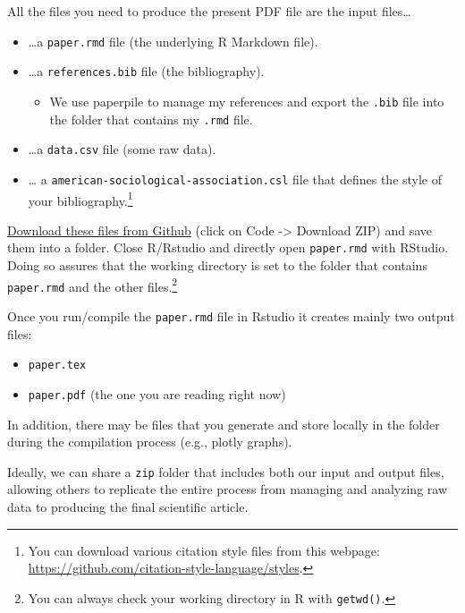 \documentclass[
  12pt,
]{article}
\providecommand{\tightlist}{%
  \setlength{\itemsep}{0pt}\setlength{\parskip}{0pt}}
\begin{document}
All the files you need to produce the present PDF file are the input files\ldots{}

\begin{itemize}
\tightlist
\item
  \ldots a \texttt{paper.rmd} file (the underlying R Markdown file).
\item
  \ldots a \texttt{references.bib} file (the bibliography).

  \begin{itemize}
  \tightlist
  \item
    We use paperpile to manage my references and export the \texttt{.bib} file into the folder that contains my \texttt{.rmd} file.
  \end{itemize}
\item
  \ldots a \texttt{data.csv} file (some raw data).
\item
  \ldots{} a \texttt{american-sociological-association.csl} file that defines the style of your bibliography.\footnote{You can download various citation style files from this webpage: \url{https://github.com/citation-style-language/styles}.}
\end{itemize}

\href{https://github.com/paulcbauer/Writing_a_reproducable_paper_in_rmarkdown}{Download these files from Github} (click on Code -\textgreater{} Download ZIP) and save them into a folder. Close R/Rstudio and directly open \texttt{paper.rmd} with RStudio. Doing so assures that the working directory is set to the folder that contains \texttt{paper.rmd} and the other files.\footnote{You can always check your working directory in R with \texttt{getwd()}.}

Once you run/compile the \texttt{paper.rmd} file in Rstudio it creates mainly two output files:

\begin{itemize}
\tightlist
\item
  \texttt{paper.tex}
\item
  \texttt{paper.pdf} (the one you are reading right now)
\end{itemize}

In addition, there may be files that you generate and store locally in the folder during the compilation process (e.g., plotly graphs).

Ideally, we can share a \texttt{zip} folder that includes both our input and output files, allowing others to replicate the entire process from managing and analyzing raw data to producing the final scientific article.
\end{document}
